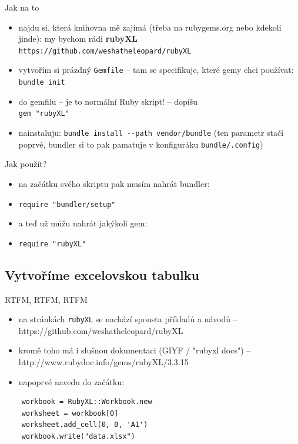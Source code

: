 \documentclass{beamer}
\begin{document}
\begin{frame}{Jak na to}
  \begin{itemize}
    \item najdu si, která knihovna mě zajímá (třeba na rubygems.org nebo kdekoli jinde): my bychom rádi \textbf{rubyXL} \texttt{https://github.com/weshatheleopard/rubyXL}
    \item vytvořím si prázdný \texttt{Gemfile} -- tam se specifikuje, které gemy chci používat: \texttt{bundle init}
    \item do gemfilu -- je to normální Ruby skript! -- dopíšu\\ \texttt{gem "rubyXL"}
    \item nainstaluju: \texttt{bundle install -{}-path vendor/bundle} (ten parametr stačí poprvé, bundler si to pak pamatuje v konfiguráku \texttt{bundle/.config})
  \end{itemize}
\end{frame}

\begin{frame}{Jak použít?}
  \begin{itemize}
    \item na začátku svého skriptu pak musím nahrát bundler:
    \item \texttt{require "bundler/setup"}
    \item a teď už můžu nahrát jakýkoli gem:
    \item \texttt{require "rubyXL"}
  \end{itemize}
\end{frame}

\subsection{Vytvoříme excelovskou tabulku}

\begin{frame}[fragile]{RTFM, RTFM, RTFM}
  \begin{itemize}
    \item na stránkách \texttt{rubyXL} se nachází spousta příkladů a návodů -- https://github.com/weshatheleopard/rubyXL
    \item kromě toho má i slušnou dokumentaci (GIYF / "rubyxl docs") -- http://www.rubydoc.info/gems/rubyXL/3.3.15
    \item napoprvé navedu do začátku:
  \end{itemize}
  {\scriptsize
  \begin{verbatim}
    workbook = RubyXL::Workbook.new
    worksheet = workbook[0]
    worksheet.add_cell(0, 0, 'A1')
    workbook.write("data.xlsx")
  \end{verbatim}
  }
\end{frame}
\end{document}
